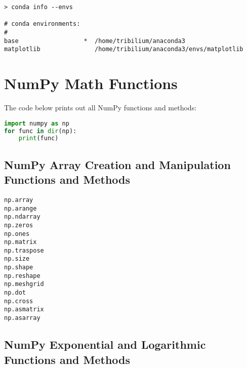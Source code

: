 \documentclass{book}
\newenvironment{key_terms}{\begin{multicols}{3}}{\end{multicols}} %
\begin{document}
\begin{lstlisting}
> conda info --envs

# conda environments:
#
base                  *  /home/tribilium/anaconda3
matplotlib               /home/tribilium/anaconda3/envs/matplotlib
\end{lstlisting}
    




    
        \hypertarget{numpy-math-functions}{%
\section{NumPy Math Functions}\label{numpy-math-functions}}
    




    
        The code below prints out all NumPy functions and methods:

\begin{lstlisting}[language=Python]
import numpy as np
for func in dir(np):
    print(func)
\end{lstlisting}
    




    
        \hypertarget{numpy-array-creation-and-manipulation-functions-and-methods}{%
\subsection{NumPy Array Creation and Manipulation Functions and
Methods}\label{numpy-array-creation-and-manipulation-functions-and-methods}}
    




    
        \begin{key_terms}
        \begin{lstlisting}
np.array
np.arange
np.ndarray
np.zeros
np.ones
np.matrix
np.traspose
np.size
np.shape
np.reshape
np.meshgrid
np.dot
np.cross
np.asmatrix
np.asarray
\end{lstlisting}
        \end{key_terms}

    




    
        \hypertarget{numpy-exponential-and-logarithmic-functions-and-methods}{%
\subsection{NumPy Exponential and Logarithmic Functions and
Methods}\label{numpy-exponential-and-logarithmic-functions-and-methods}}
    
\end{document}
